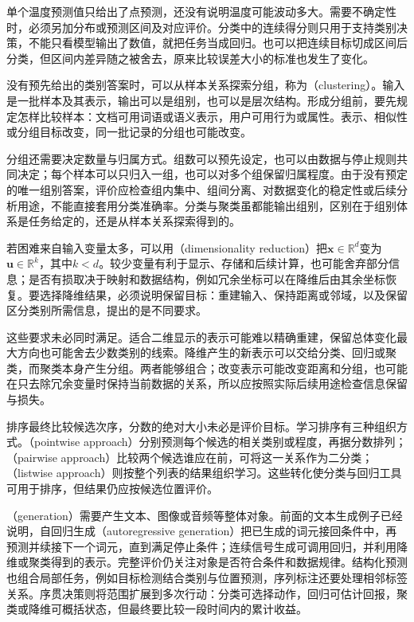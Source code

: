 单个温度预测值只给出了点预测，还没有说明温度可能波动多大。需要不确定性时，必须另加分布或预测区间及对应评价。分类中的连续得分则只用于支持类别决策，不能只看模型输出了数值，就把任务当成回归。也可以把连续目标切成区间后分类，但区间内差异随之被舍去，原来比较误差大小的标准也发生了变化。

没有预先给出的类别答案时，可以从样本关系探索分组，称为（clustering）。输入是一批样本及其表示，输出可以是组别，也可以是层次结构。形成分组前，要先规定怎样比较样本：文档可用词语或语义表示，用户可用行为或属性。表示、相似性或分组目标改变，同一批记录的分组也可能改变。

分组还需要决定数量与归属方式。组数可以预先设定，也可以由数据与停止规则共同决定；每个样本可以只归入一组，也可以对多个组保留归属程度。由于没有预定的唯一组别答案，评价应检查组内集中、组间分离、对数据变化的稳定性或后续分析用途，不能直接套用分类准确率。分类与聚类虽都能输出组别，区别在于组别体系是任务给定的，还是从样本关系探索得到的。

若困难来自输入变量太多，可以用（dimensionality reduction）把$\bm{x}\in\mathbb{R}^{d}$变为$\bm{u}\in\mathbb{R}^{k}$，其中$k<d$。较少变量有利于显示、存储和后续计算，也可能舍弃部分信息；是否有损取决于映射和数据结构，例如冗余坐标可以在降维后由其余坐标恢复。要选择降维结果，必须说明保留目标：重建输入、保持距离或邻域，以及保留区分类别所需信息，提出的是不同要求。

这些要求未必同时满足。适合二维显示的表示可能难以精确重建，保留总体变化最大方向也可能舍去少数类别的线索。降维产生的新表示可以交给分类、回归或聚类，而聚类本身产生分组。两者能够组合；改变表示可能改变距离和分组，也可能在只去除冗余变量时保持当前数据的关系，所以应按照实际后续用途检查信息保留与损失。

排序最终比较候选次序，分数的绝对大小未必是评价目标。学习排序有三种组织方式。（pointwise approach）分别预测每个候选的相关类别或程度，再据分数排列；（pairwise approach）比较两个候选谁应在前，可将这一关系作为二分类；（listwise approach）则按整个列表的结果组织学习。这些转化使分类与回归工具可用于排序，但结果仍应按候选位置评价。

（generation）需要产生文本、图像或音频等整体对象。前面的文本生成例子已经说明，自回归生成（autoregressive generation）把已生成的词元接回条件中，再预测并续接下一个词元，直到满足停止条件；连续信号生成可调用回归，并利用降维或聚类得到的表示。完整评价仍关注对象是否符合条件和数据规律。结构化预测也组合局部任务，例如目标检测结合类别与位置预测，序列标注还要处理相邻标签关系。序贯决策则将范围扩展到多次行动：分类可选择动作，回归可估计回报，聚类或降维可概括状态，但最终要比较一段时间内的累计收益。

